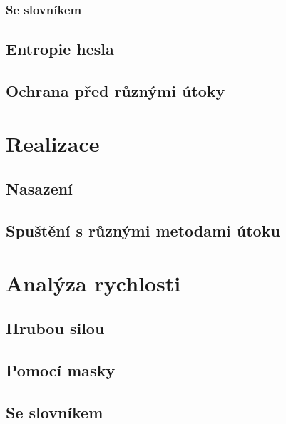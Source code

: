 \subsection{Se slovníkem}

\section{Entropie hesla}

\section{Ochrana před různými útoky}

\chapter{Realizace}

\section{Nasazení}

\section{Spuštění s různými metodami útoku}

\chapter{Analýza rychlosti}

\section{Hrubou silou}

\section{Pomocí masky}

\section{Se slovníkem}
